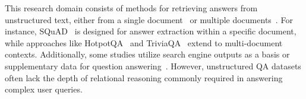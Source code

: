 This research domain consists of methods for retrieving answers from unstructured text, either from a single document~\cite{rajpurkar-etal-2016-squad} or multiple documents~\cite{trischler-etal-2017-newsqa, yang-etal-2018-hotpotqa, TriviaQA, WelblSR18, dunn2017searchqa}. For instance, SQuAD~\cite{rajpurkar-etal-2016-squad} is designed for answer extraction within a specific document, while approaches like HotpotQA~\cite{yang-etal-2018-hotpotqa} and TriviaQA~\cite{TriviaQA} extend to multi-document contexts. Additionally, some studies utilize search engine outputs as a basis or supplementary data for question answering~\cite{DBLP:conf/nips/NguyenRSGTMD16, kwiatkowski-etal-2019-natural}.
However, unstructured QA datasets often lack the depth of relational reasoning commonly required in answering complex user queries. 
